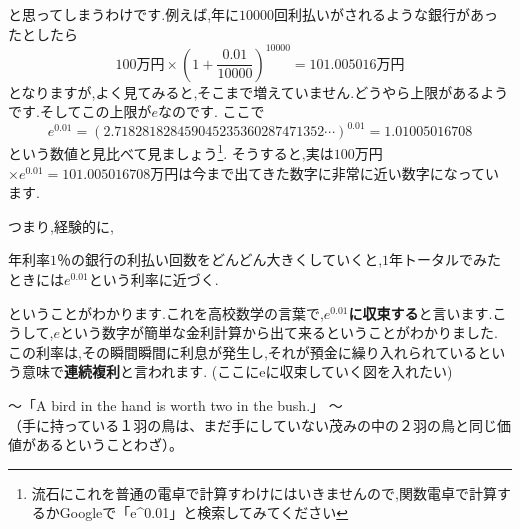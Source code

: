 と思ってしまうわけです.例えば,年に$10000$回利払いがされるような銀行があったとしたら
\[
100\mbox{万円}\times (1 + \frac{0.01}{10000})^{10000} = 101.005016 \mbox{万円}
\]
となりますが,よく見てみると,そこまで増えていません.どうやら上限があるようです.そしてこの上限が$e$なのです.
ここで
\[
e^{0.01} = (2.718281828459045235360287471352 \cdots )^{0.01} = 1.01005016708
\]
という数値と見比べて見ましょう\footnote{流石にこれを普通の電卓で計算すわけにはいきませんので,関数電卓で計算するかGoogleで「e\^{}0.01」と検索してみてください}.
そうすると,実は$100$万円$\times e^{0.01} =  101.005016708$万円は今まで出てきた数字に非常に近い数字になっています.\par
つまり,経験的に,
\begin{center}
年利率$1$％の銀行の利払い回数をどんどん大きくしていくと,$1$年トータルでみたときには$e^{0.01}$という利率に近づく.
\end{center}
ということがわかります.これを高校数学の言葉で,{\bf $e^{0.01}$に収束する}と言います.こうして,$e$という数字が簡単な金利計算から出て来るということがわかりました.
この利率は,その瞬間瞬間に利息が発生し,それが預金に繰り入れられているという意味で{\bf 連続複利}と言われます.
(ここにeに収束していく図を入れたい)
\begin{flushright}
〜「A bird in the hand is worth two in the bush.」 〜\\
（手に持っている１羽の鳥は、まだ手にしていない茂みの中の２羽の鳥と同じ価値があるということわざ）。
\end{flushright}

